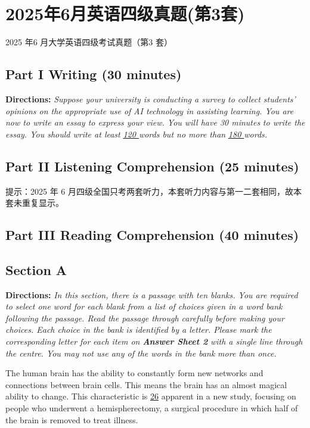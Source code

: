 \documentclass[UTF8,11pt]{ctexart}
\begin{document}
\section*{2025年6月英语四级真题(第3套)}
2025 年6 月大学英语四级考试真题（第3 套）


\subsection*{\textbf{Part I Writing} \textbf{(30 minutes)}}


\textbf{Directions:} \textit{Suppose your university is conducting a survey to collect students’ opinions on the appropriate use of} \textit{AI technology in assisting learning. You are now to write an essay to express your view. You will have 30 minutes} \textit{to write the essay. You should write at least }\textit{\uline{120 }}\textit{words but no more than }\textit{\uline{180 }}\textit{words.}


\subsection*{\textbf{Part II} \textbf{Listening Comprehension} \textbf{(25 minutes)}}


提示：2025 年 6 月四级全国只考两套听力，本套听力内容与第一二套相同，故本套未重复显示。


\subsection*{\textbf{Part III Reading Comprehension (40 minutes)}}


\subsection*{\textbf{Section A}}


\textbf{Directions:} \textit{In this section, there is a passage with ten blanks. You are required to select one word for each blank} \textit{from a list of choices given in a word bank following the passage. Read the passage through carefully before} \textit{making your choices. Each choice in the bank is identified by a letter. Please mark the corresponding letter for} \textit{each item on }\textbf{\textit{Answer Sheet 2}}\textit{ with a single line through the centre. You may not use any of the words in the bank} \textit{more than once.}


The human brain has the ability to constantly form new networks and connections between brain cells. This means the brain has an almost magical ability to change. This characteristic is \uline{26} apparent in a new study, focusing on people who underwent a hemispherectomy, a surgical procedure in which half of the brain is removed to treat illness.
\end{document}
